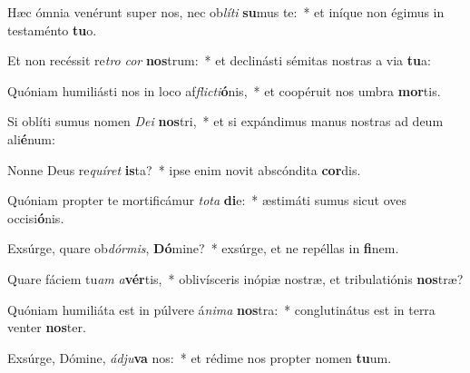 \item Hæc ómnia venérunt super nos, nec ob\textit{lí}\textit{ti} \textbf{su}mus te:~* et iníque non égimus in testaménto \textbf{tu}o.
\item Et non recéssit re\textit{tro} \textit{cor} \textbf{nos}trum:~* et declinásti sémitas nostras a via \textbf{tu}a:
\item Quóniam humiliásti nos in loco af\textit{flic}\textit{ti}\textbf{ó}nis,~* et coopéruit nos umbra \textbf{mor}tis.
\item Si oblíti sumus nomen \textit{De}\textit{i} \textbf{nos}tri,~* et si expándimus manus nostras ad deum ali\textbf{é}num:
\item Nonne Deus re\textit{quí}\textit{ret} \textbf{is}ta?~* ipse enim novit abscóndita \textbf{cor}dis.
\item Quóniam propter te mortificámur \textit{to}\textit{ta} \textbf{di}e:~* æstimáti sumus sicut oves occisi\textbf{ó}nis.
\item Exsúrge, quare ob\textit{dór}\textit{mis}, \textbf{Dó}mine?~* exsúrge, et ne repéllas in \textbf{fi}nem.
\item Quare fáciem tu\textit{am} \textit{a}\textbf{vér}tis,~* oblivísceris inópiæ nostræ, et tribulatiónis \textbf{nos}træ?
\item Quóniam humiliáta est in púlvere á\textit{ni}\textit{ma} \textbf{nos}tra:~* conglutinátus est in terra venter \textbf{nos}ter.
\item Exsúrge, Dómine, \textit{ád}\textit{ju}\textbf{va} nos:~* et rédime nos propter nomen \textbf{tu}um.
